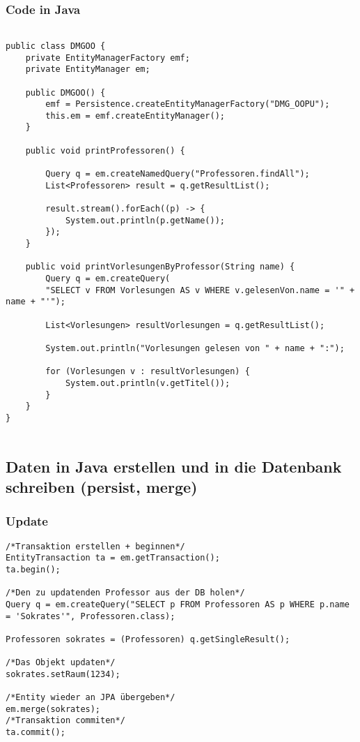 \subsubsection{Code in Java}
\begin{lstlisting}[caption={JPA Grundlagen in Java}]

public class DMGOO {
    private EntityManagerFactory emf;
    private EntityManager em;

    public DMGOO() {
        emf = Persistence.createEntityManagerFactory("DMG_OOPU");
        this.em = emf.createEntityManager();
    }

    public void printProfessoren() {

        Query q = em.createNamedQuery("Professoren.findAll");
        List<Professoren> result = q.getResultList();

        result.stream().forEach((p) -> {
            System.out.println(p.getName());
        });
    }

    public void printVorlesungenByProfessor(String name) {
        Query q = em.createQuery(
        "SELECT v FROM Vorlesungen AS v WHERE v.gelesenVon.name = '" + name + "'");

        List<Vorlesungen> resultVorlesungen = q.getResultList();

        System.out.println("Vorlesungen gelesen von " + name + ":");
        
        for (Vorlesungen v : resultVorlesungen) {
            System.out.println(v.getTitel());
        }
    }
}


\end{lstlisting}


\subsection{Daten in Java erstellen und in die Datenbank schreiben (persist, merge)}

\subsubsection{Update}
\begin{lstlisting}[caption={Daten updaten mit JPA}]
/*Transaktion erstellen + beginnen*/
EntityTransaction ta = em.getTransaction();
ta.begin();

/*Den zu updatenden Professor aus der DB holen*/
Query q = em.createQuery("SELECT p FROM Professoren AS p WHERE p.name = 'Sokrates'", Professoren.class);

Professoren sokrates = (Professoren) q.getSingleResult();

/*Das Objekt updaten*/
sokrates.setRaum(1234);

/*Entity wieder an JPA übergeben*/
em.merge(sokrates);
/*Transaktion commiten*/
ta.commit();
\end{lstlisting}

